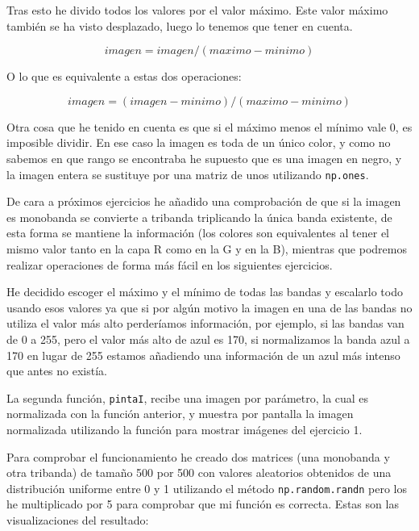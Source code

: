 \documentclass[12pt, spanish]{article}
\begin{document}
Tras esto he divido todos los valores por el valor máximo. Este valor máximo también se ha visto desplazado, luego lo tenemos que tener en cuenta.

$$ imagen = imagen / (maximo - minimo) $$

O lo que es equivalente a estas dos operaciones:

$$ imagen = (imagen - minimo) / (maximo - minimo) $$

Otra cosa que he tenido en cuenta es que si el máximo menos el mínimo vale 0, es imposible dividir. En ese caso la imagen es toda de un único color, y como no sabemos en que rango se encontraba he supuesto que es una imagen en negro, y la imagen entera se sustituye por una matriz de unos utilizando \texttt{np.ones}\cite{np_ones}.

De cara a próximos ejercicios he añadido una comprobación de que si la imagen es monobanda se convierte a tribanda triplicando la única banda existente, de esta forma se mantiene la información (los colores son equivalentes al tener el mismo valor tanto en la capa R como en la G y en la B), mientras que podremos realizar operaciones de forma más fácil en los siguientes ejercicios.


He decidido escoger el máximo y el mínimo de todas las bandas y escalarlo todo usando esos valores ya que si por algún motivo la imagen en una de las bandas no utiliza el valor más alto perderíamos información, por ejemplo, si las bandas van de 0 a 255, pero el valor más alto de azul es 170, si normalizamos la banda azul a 170 en lugar de 255 estamos añadiendo una información de un azul más intenso que antes no existía.

La segunda función, \texttt{pintaI}, recibe una imagen por parámetro, la cual es normalizada con la función anterior, y muestra por pantalla la imagen normalizada utilizando la función para mostrar imágenes del ejercicio 1.

Para comprobar el funcionamiento he creado dos matrices (una monobanda y otra tribanda) de tamaño 500 por 500 con valores aleatorios obtenidos de una distribución uniforme entre 0 y 1 utilizando el método \texttt{np.random.randn}\cite{np_randn} pero los he multiplicado por 5 para comprobar que mi función es correcta. Estas son las visualizaciones del resultado:
\end{document}
